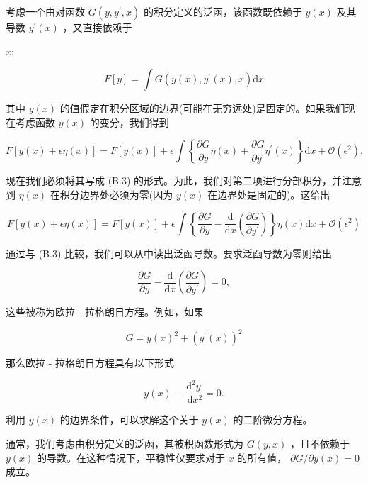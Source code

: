 \documentclass[10pt]{article}
\begin{document}
考虑一个由对函数 \(G\left( {y,{y}^{\prime },x}\right)\) 的积分定义的泛函，该函数既依赖于 \(y\left( x\right)\) 及其导数 \({y}^{\prime }\left( x\right)\) ，又直接依赖于

\(x :\)

\[
F\left\lbrack  y\right\rbrack   = \int G\left( {y\left( x\right) ,{y}^{\prime }\left( x\right) ,x}\right) \mathrm{d}x \tag{B.5}
\]

其中 \(y\left( x\right)\) 的值假定在积分区域的边界(可能在无穷远处)是固定的。如果我们现在考虑函数 \(y\left( x\right)\) 的变分，我们得到

\[
F\left\lbrack  {y\left( x\right)  + {\epsilon \eta }\left( x\right) }\right\rbrack   = F\left\lbrack  {y\left( x\right) }\right\rbrack   + \epsilon \int \left\{  {\frac{\partial G}{\partial y}\eta \left( x\right)  + \frac{\partial G}{\partial {y}^{\prime }}{\eta }^{\prime }\left( x\right) }\right\}  \mathrm{d}x + \mathcal{O}\left( {\epsilon }^{2}\right) . \tag{B.6}
\]

现在我们必须将其写成 (B.3) 的形式。为此，我们对第二项进行分部积分，并注意到 \(\eta \left( x\right)\) 在积分边界处必须为零(因为 \(y\left( x\right)\) 在边界处是固定的)。这给出

\[
F\left\lbrack  {y\left( x\right)  + {\epsilon \eta }\left( x\right) }\right\rbrack   = F\left\lbrack  {y\left( x\right) }\right\rbrack   + \epsilon \int \left\{  {\frac{\partial G}{\partial y} - \frac{\mathrm{d}}{\mathrm{d}x}\left( \frac{\partial G}{\partial {y}^{\prime }}\right) }\right\}  \eta \left( x\right) \mathrm{d}x + \mathcal{O}\left( {\epsilon }^{2}\right)  \tag{B.7}
\]

通过与 (B.3) 比较，我们可以从中读出泛函导数。要求泛函导数为零则给出

\[
\frac{\partial G}{\partial y} - \frac{\mathrm{d}}{\mathrm{d}x}\left( \frac{\partial G}{\partial {y}^{\prime }}\right)  = 0, \tag{B.8}
\]

这些被称为欧拉 - 拉格朗日方程。例如，如果

\[
G = y{\left( x\right) }^{2} + {\left( {y}^{\prime }\left( x\right) \right) }^{2} \tag{B.9}
\]

那么欧拉 - 拉格朗日方程具有以下形式

\[
y\left( x\right)  - \frac{{\mathrm{d}}^{2}y}{\mathrm{\;d}{x}^{2}} = 0. \tag{B.10}
\]

利用 \(y\left( x\right)\) 的边界条件，可以求解这个关于 \(y\left( x\right)\) 的二阶微分方程。

通常，我们考虑由积分定义的泛函，其被积函数形式为 \(G\left( {y,x}\right)\) ，且不依赖于 \(y\left( x\right)\) 的导数。在这种情况下，平稳性仅要求对于 \(x\) 的所有值， \(\partial G/\partial y\left( x\right)  = 0\) 成立。
\end{document}
